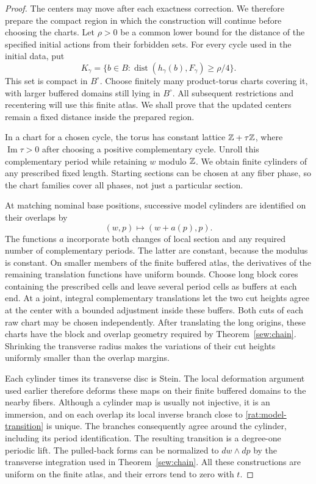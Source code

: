 \begin{proof}
The centers may move after each exactness correction. We therefore
prepare the compact region in which the construction will continue
before choosing the charts. Let $\rho>0$ be a common lower bound
for the distance of the specified initial actions from their
forbidden sets. For every cycle used in the initial data, put
\[
 K_\gamma=\{b\in B:
   \operatorname{dist}(h_\gamma(b),F_\gamma)\geq\rho/4\}.
\]
This set is compact in $B^\circ$. Choose finitely many
product-torus charts covering it, with larger buffered domains
still lying in $B^\circ$. All subsequent restrictions and
recentering will use this finite atlas. We shall prove that the
updated centers remain a fixed distance inside the prepared region.

In a chart for a chosen cycle, the torus has constant lattice
$\mathbb Z+\tau\mathbb Z$, where $\operatorname{Im}\tau>0$ after choosing a
positive complementary cycle. Unroll this complementary period
while retaining $w$ modulo $\mathbb Z$. We obtain finite cylinders of
any prescribed fixed length. Starting sections can be chosen at
any fiber phase, so the chart families cover all phases, not just
a particular section.

At matching nominal base positions, successive model cylinders
are identified on their overlaps by
\begin{equation}\label{rat:model-transition}
 (w,p)\longmapsto(w+a(p),p).
\end{equation}
The functions $a$ incorporate both changes of local section and
any required number of complementary periods. The latter are
constant, because the modulus is constant. On smaller members of
the finite buffered atlas, the derivatives of the remaining
translation functions have uniform bounds. Choose long block
cores containing the prescribed cells and leave several period
cells as buffers at each end. At a joint, integral complementary
translations let the two cut heights agree at the center with a
bounded adjustment inside these buffers. Both cuts of each raw
chart may be chosen independently. After translating the long
origins, these charts have the block and overlap geometry required
by Theorem~\ref{sew:chain}. Shrinking the transverse radius makes
the variations of their cut heights uniformly smaller than the
overlap margins.

Each cylinder times its transverse disc is Stein. The local
deformation argument used earlier therefore deforms these maps
on their finite buffered domains to the nearby fibers. Although
a cylinder map is usually not injective, it is an immersion, and
on each overlap its local inverse branch close to
\eqref{rat:model-transition} is unique. The branches consequently
agree around the cylinder, including its period identification.
The resulting transition is a degree-one periodic lift. The
pulled-back forms can be normalized to $dw\wedge dp$ by the
transverse integration used in Theorem~\ref{sew:chain}.
All these constructions are uniform on the finite atlas, and
their errors tend to zero with $t$.


\end{proof}
